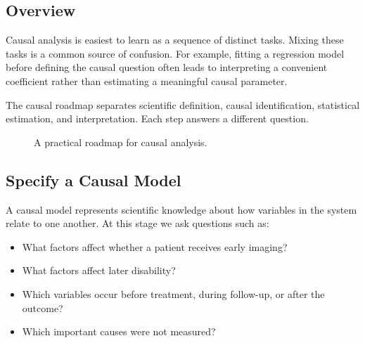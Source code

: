 \label{lec:2-2}

\subsection{Overview}

Causal analysis is easiest to learn as a sequence of distinct tasks. Mixing these tasks is a common source of confusion. For example, fitting a regression model before defining the causal question often leads to interpreting a convenient coefficient rather than estimating a meaningful causal parameter.

\begin{keyidea}
The causal roadmap separates scientific definition, causal identification, statistical estimation, and interpretation. Each step answers a different question.
\end{keyidea}

\begin{figure}[H]
\centering
{}
\caption{A practical roadmap for causal analysis.}
\end{figure}

\subsection{Specify a Causal Model}

A causal model represents scientific knowledge about how variables in the system relate to one another. At this stage we ask questions such as:
\begin{itemize}
  \item What factors affect whether a patient receives early imaging?
  \item What factors affect later disability?
  \item Which variables occur before treatment, during follow-up, or after the outcome?
  \item Which important causes were not measured?
\end{itemize}

